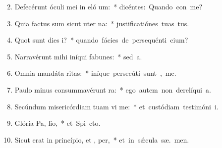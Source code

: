 \begin{flushleft}
\begin{enumerate}[leftmargin=*]
\setcounter{enumi}{1}

\item Defecérunt óculi mei in eló um:~* \mbox{dicéntes: Quando con me?}
\item Quia factus sum sicut uter  na:~* \mbox{justificatiónes tuas   tus.}
\item Quot sunt dies  i?~* \mbox{quando fácies de persequénti  cium?}
\item Narravérunt mihi iníqui fabunes:~* \mbox{sed    a.}
\item Omnia mandáta  ritas:~* \mbox{iníque persecúti sunt ,  me.}
\item Paulo minus consummavérunt   ra:~* \mbox{ego autem non derelíqui  a.}
\item Secúndum misericórdiam tuam vi me:~* \mbox{et custódiam testimóni  i.}
\item Glória Pa,  lio,~* \mbox{et Spi cto.}
\item Sicut erat in princípio, et ,  per,~* \mbox{et in s\'{\ae}cula sæ. men.}


\end{enumerate}
\end{flushleft}


